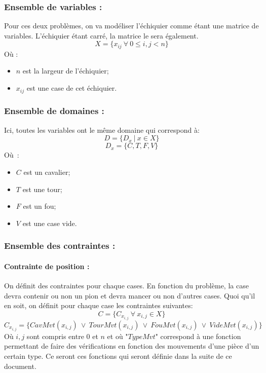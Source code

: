 \documentclass[a4paper,11pt]{article}
\newcommand{\OR}{~\vee~}
\begin{document}
        \subsubsection{Ensemble de variables :}
            Pour ces deux problèmes, on va modéliser l'échiquier comme étant une matrice de variables. L'échiquier étant carré, la matrice le sera également.
            \label{echec_variable}
            $$X = \{x_{ij}~\forall~0 \leq i, j < n\}$$
            Où :
            \begin{itemize}
                \item $n$ est la largeur de l'échiquier;
                \item $x_{ij}$ est une case de cet échiquier.
            \end{itemize}
            
        \subsubsection{Ensemble de domaines :}
            Ici, toutes les variables ont le même domaine qui correspond à:
            \label{echec_domaine}
            $$D = \{D_{x}~|~x \in X\}$$ 
            $$D_{x} = \{C, T, F, V\}$$
            Où~:
            \begin{itemize}
                \item $C$ est un cavalier;
                \item $T$ est une tour;
                \item $F$ est un fou;
                \item $V$ est une case vide.
            \end{itemize}
        
        \subsubsection{Ensemble des contraintes :}
            \paragraph{Contrainte de position :}
                \label{contrainte_position}
                On définit des contraintes pour chaque cases.  En fonction du problème, la case devra contenir ou non un pion et devra mancer ou non d'autres cases.  Quoi qu'il en soit, on définit pour chaque case les contraintes suivantes:
                \[C = \{C_{x_{i, j}}~\forall~x_{i, j} \in X\}\]
                \[C_{x_{i, j}} = \{CavMvt(x_{i, j}) \OR TourMvt(x_{i, j}) \OR FouMvt(x_{i, j}) \OR VideMvt(x_{i, j})\}\]
                Où $i, j$ sont compris entre $0$ et $n$ et où "$TypeMvt$" correspond à une fonction permettant de faire des vérifications en fonction des mouvements d'une pièce d'un certain type.  Ce seront ces fonctions qui seront définie dans la suite de ce document.
        
\end{document}
